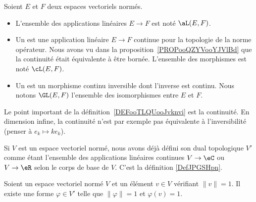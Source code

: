 \begin{definition}      \label{DEFooTLQUooJvknvi}
    Soient \( E\) et \( F\) deux espaces vectoriels normés.
    \begin{itemize}
        \item
            L'ensemble des applications linéaires \( E\to F\) est noté \( \aL(E,F)\).
        \item Un  est une application linéaire \( E\to F\) continue pour la topologie de la norme opérateur. Nous avons vu dans la proposition~\ref{PROPooQZYVooYJVlBd} que la continuité était équivalente à être bornée. L'ensemble des morphismes est noté \( \cL(E,F)\).
        \item
            Un  est un morphisme continu inversible dont l'inverse est continu. Nous notons \( \GL(E,F)\) l'ensemble des isomorphismes entre \( E\) et \( F\).
    \end{itemize}
\end{definition}

Le point important de la définition~\ref{DEFooTLQUooJvknvi} est la continuité. En dimension infine, la continuité n'est par exemple pas équivalente à l'inversibilité (penser à \( e_k\mapsto ke_k\)).

Si \( V\) est un espace vectoriel normé, nous avons déjà défini son dual topologique \( V'\) comme étant l'ensemble des applications linéaires continues \( V\to \eC\) ou \( V\to \eR\) selon le corps de base de \( V\). C'est la définition \ref{DefJPGSHpn}.

\begin{proposition}
    Soient un espace vectoriel normé \( V\) et un élément \( v\in V\) vérifiant \( \| v \|=1\). Il existe une forme \( \varphi\in V'\) telle que \( \| \varphi \|=1\) et \( \varphi(v)=1\).
\end{proposition}

